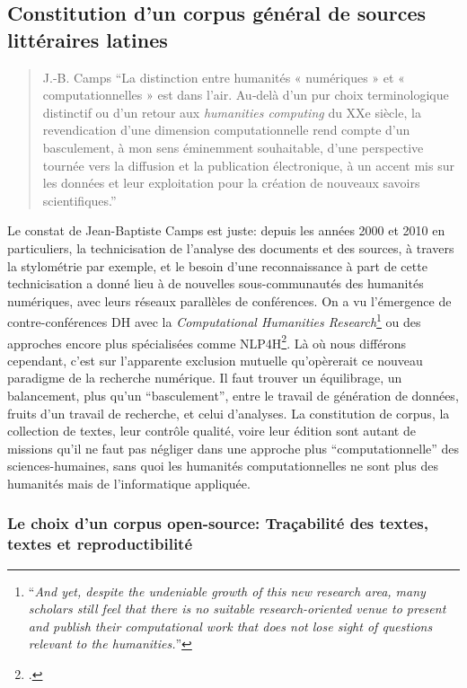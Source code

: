 \subsection{Constitution d’un corpus général de sources littéraires latines} 

\begin{quote}{J.-B. Camps}
\enquote{La distinction entre humanités « numériques » et « computationnelles » est dans l’air. Au‑delà d’un pur choix terminologique distinctif ou d’un retour aux \textit{humanities computing} du XXe siècle, la revendication d’une dimension computationnelle rend compte d’un basculement, à mon sens éminemment souhaitable, d’une perspective tournée vers la diffusion et la publication électronique, à un accent mis sur les données et leur exploitation pour la création de nouveaux savoirs scientifiques.}\footnotemark
\end{quote}

Le constat de Jean-Baptiste Camps est juste: depuis les années 2000 et 2010 en particuliers, la technicisation de l'analyse des documents et des sources, à travers la stylométrie par exemple, et le besoin d'une reconnaissance à part de cette technicisation a donné lieu à de nouvelles sous-communautés des humanités numériques, avec leurs réseaux parallèles de conférences. On a vu l'émergence de contre-conférences DH avec la \textit{Computational Humanities Research}\footnote{\enquote{\textit{And yet, despite the undeniable growth of this new research area, many scholars still feel that there is no suitable research-oriented venue to present and publish their computational work that does not lose sight of questions relevant to the humanities.}}\textcite{noauthor_computational_nodate}} ou des approches encore plus spécialisées comme NLP4H\footcite{noauthor_workshop_nodate}. Là où nous différons cependant, c'est sur l'apparente exclusion mutuelle qu'opèrerait ce nouveau paradigme de la recherche numérique.  Il faut trouver un équilibrage, un balancement, plus qu'un \enquote{basculement}, entre le travail de génération de données, fruits d'un travail de recherche, et celui d'analyses. La constitution de corpus, la collection de textes, leur contrôle qualité, voire leur édition sont autant de missions qu'il ne faut pas négliger dans une approche plus ``computationnelle'' des sciences-humaines, sans quoi les humanités computationnelles ne sont plus des humanités mais de l'informatique appliquée.

\subsubsection{Le choix d’un corpus open-source: Traçabilité des textes, textes et reproductibilité}

